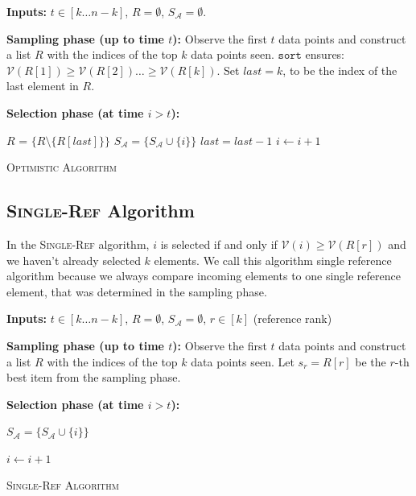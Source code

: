 \begin{algorithm}[ht]
\textbf{Inputs:} $t\in[k\dots n-k]$, $R = \emptyset$, $S_{\mathcal{A}} = \emptyset$.

\textbf{Sampling phase (up to time $t$):} Observe the first $t$ data points and construct a list $R$ with the indices of the top $k$ data points seen. $\texttt{sort}$ ensures: $ \mathcal{V}(R[1]) \geq \mathcal{V}(R[2]) \dots \geq\mathcal{V}(R[k]).$
Set $last = k$, to be the index of the last element in $R$.

\textbf{Selection phase (at time $i>t$):}

\begin{algorithmic}[1]
        \STATE $R$ = $\{R \setminus \{R[last]\}\}$ \hfill{}
        \STATE $S_\mathcal{A} = \{ S_\mathcal{A} \cup \{i \}\}$ \hfill{}
        \STATE $last = last - 1$
\ENDIF 
$i\gets i + 1$
\end{algorithmic}
 \caption{\textsc{Optimistic Algorithm}}
\end{algorithm}

\subsection{\textsc{Single-Ref} Algorithm}
In the \textsc{Single-Ref} algorithm, $i$ is selected if and only if $\mathcal{V}(i) \geq \mathcal{V}(R[r])$ and we haven't already selected $k$ elements. 
We call this algorithm single reference algorithm because we always compare incoming elements to one single reference element, that was determined in the sampling phase.

\begin{algorithm}[ht]
\textbf{Inputs:} $t\in[k\dots n-k]$, $R = \emptyset$, $S_{\mathcal{A}} = \emptyset$, $r \in [k]$ (reference rank)

 \textbf{Sampling phase (up to time $t$):} Observe the first $t$ data points and construct a list $R$ with the indices of the top $k$ data points seen. Let $s_r = R[r]$ be the $r$-th best item from the sampling phase.

\textbf{Selection phase (at time $i>t$):} 
\begin{algorithmic}[1]
        \STATE $S_\mathcal{A} = \{ S_\mathcal{A} \cup \{i \}\}$ \hfill{}

\ENDIF 

$i\gets i + 1$
\end{algorithmic}
 \caption{\textsc{Single-Ref Algorithm}}
\end{algorithm}

